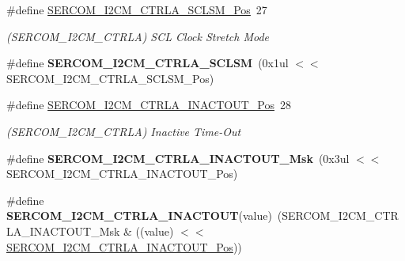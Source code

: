 \begin{DoxyCompactItemize}
\item 
\hypertarget{group___s_a_m_l21___s_e_r_c_o_m_ga3267a4fcea3a01b8d36306f3eda2d2f7}{}\#define \hyperlink{group___s_a_m_l21___s_e_r_c_o_m_ga3267a4fcea3a01b8d36306f3eda2d2f7}{S\+E\+R\+C\+O\+M\+\_\+\+I2\+C\+M\+\_\+\+C\+T\+R\+L\+A\+\_\+\+S\+C\+L\+S\+M\+\_\+\+Pos}~27\label{group___s_a_m_l21___s_e_r_c_o_m_ga3267a4fcea3a01b8d36306f3eda2d2f7}

\begin{DoxyCompactList}\small\item\em (S\+E\+R\+C\+O\+M\+\_\+\+I2\+C\+M\+\_\+\+C\+T\+R\+L\+A) S\+C\+L Clock Stretch Mode \end{DoxyCompactList}\item 
\hypertarget{group___s_a_m_l21___s_e_r_c_o_m_gad0f1373a6e845e01fb7ae12fd9d8a8bb}{}\#define {\bfseries S\+E\+R\+C\+O\+M\+\_\+\+I2\+C\+M\+\_\+\+C\+T\+R\+L\+A\+\_\+\+S\+C\+L\+S\+M}~(0x1ul $<$$<$ S\+E\+R\+C\+O\+M\+\_\+\+I2\+C\+M\+\_\+\+C\+T\+R\+L\+A\+\_\+\+S\+C\+L\+S\+M\+\_\+\+Pos)\label{group___s_a_m_l21___s_e_r_c_o_m_gad0f1373a6e845e01fb7ae12fd9d8a8bb}

\item 
\hypertarget{group___s_a_m_l21___s_e_r_c_o_m_gab108df919979b2311d7317ae9fbfb5a3}{}\#define \hyperlink{group___s_a_m_l21___s_e_r_c_o_m_gab108df919979b2311d7317ae9fbfb5a3}{S\+E\+R\+C\+O\+M\+\_\+\+I2\+C\+M\+\_\+\+C\+T\+R\+L\+A\+\_\+\+I\+N\+A\+C\+T\+O\+U\+T\+\_\+\+Pos}~28\label{group___s_a_m_l21___s_e_r_c_o_m_gab108df919979b2311d7317ae9fbfb5a3}

\begin{DoxyCompactList}\small\item\em (S\+E\+R\+C\+O\+M\+\_\+\+I2\+C\+M\+\_\+\+C\+T\+R\+L\+A) Inactive Time-\/\+Out \end{DoxyCompactList}\item 
\hypertarget{group___s_a_m_l21___s_e_r_c_o_m_gad3a94dc0be3874c61e6174f99f338134}{}\#define {\bfseries S\+E\+R\+C\+O\+M\+\_\+\+I2\+C\+M\+\_\+\+C\+T\+R\+L\+A\+\_\+\+I\+N\+A\+C\+T\+O\+U\+T\+\_\+\+Msk}~(0x3ul $<$$<$ S\+E\+R\+C\+O\+M\+\_\+\+I2\+C\+M\+\_\+\+C\+T\+R\+L\+A\+\_\+\+I\+N\+A\+C\+T\+O\+U\+T\+\_\+\+Pos)\label{group___s_a_m_l21___s_e_r_c_o_m_gad3a94dc0be3874c61e6174f99f338134}

\item 
\hypertarget{group___s_a_m_l21___s_e_r_c_o_m_ga686487bc3ee6ddbc3df36c38284bb72a}{}\#define {\bfseries S\+E\+R\+C\+O\+M\+\_\+\+I2\+C\+M\+\_\+\+C\+T\+R\+L\+A\+\_\+\+I\+N\+A\+C\+T\+O\+U\+T}(value)~(S\+E\+R\+C\+O\+M\+\_\+\+I2\+C\+M\+\_\+\+C\+T\+R\+L\+A\+\_\+\+I\+N\+A\+C\+T\+O\+U\+T\+\_\+\+Msk \& ((value) $<$$<$ \hyperlink{group___s_a_m_l21___s_e_r_c_o_m_gab108df919979b2311d7317ae9fbfb5a3}{S\+E\+R\+C\+O\+M\+\_\+\+I2\+C\+M\+\_\+\+C\+T\+R\+L\+A\+\_\+\+I\+N\+A\+C\+T\+O\+U\+T\+\_\+\+Pos}))\label{group___s_a_m_l21___s_e_r_c_o_m_ga686487bc3ee6ddbc3df36c38284bb72a}


\end{DoxyCompactItemize}
